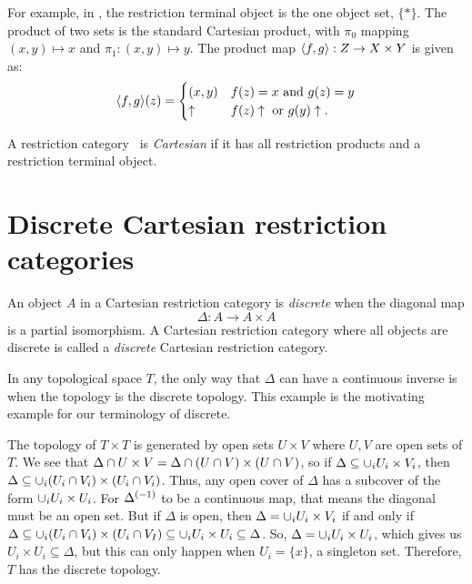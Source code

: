For example, in \Par, the restriction terminal object is the one object set, $\{*\}$. The product of
two sets is the standard Cartesian product, with $\pi_0$ mapping $(x,y) \mapsto x$ and
$\pi_1:(x,y)\mapsto y$. The product map $\langle f,g\rangle:Z\to X\times Y$ is given as:
\[
  \langle f,g\rangle(z) = \begin{cases}
    (x,y)&f(z) = x\text{ and } g(z) = y\\
    \uparrow&f(z) \uparrow\text{ or }g(y)\uparrow.
    \end{cases}
\]

\begin{definition}\label{def:cartesian_restriction_category}
  A restriction category \X\ is \emph{Cartesian} if it has all restriction products
  and a restriction terminal object.
\end{definition}

\section{Discrete Cartesian restriction categories}\label{sub:discrete_restriction_categories}

\begin{definition}\label{def:discrete_object_and_discrete_cartesian}
  An object $A$ in a Cartesian restriction category is \emph{discrete}
  when the diagonal map
  \[
    \Delta:A \to A \times A
  \]
  is a partial isomorphism.
  A  Cartesian restriction category where all objects are
  discrete is called a \emph{discrete} Cartesian restriction category.
\end{definition}


\begin{example}\label{ex:topcatp-not-discrete}
  In any topological space $T$, the only way that $\Delta$ can have a continuous inverse is when the
  topology is the discrete topology. This example is the motivating example for our terminology of
  discrete.

  The topology of $T\times T$ is generated by open sets $U\times V$ where $U,V$ are open sets of
  $T$. We see that $\Delta \cap U\times V = \Delta \cap (U\cap V) \times
  (U\cap V)$, so if $\Delta \subseteq \cup_i U_i\times V_i$, then  $\Delta \subseteq
  \cup_i (U_i\cap V_i)\times( U_i\cap V_i)$. Thus, any open cover of $\Delta$ has a
  subcover of the form $\cup_i U_i\times U_i$. For ${\Delta}^{(-1)}$ to be a continuous
  map, that means the diagonal must be an open set. But if $\Delta$ is open, then $\Delta = \cup_i
  U_i\times V_i$ if and only if $\Delta \subseteq \cup_i (U_i\cap V_i) \times (U_i \cap
  V_I) \subseteq \cup_i U_i \times U_i \subseteq \Delta$. So, $\Delta = \cup_i U_i \times U_i$,
  which gives us $U_i \times U_i \subseteq \Delta$, but this can only happen when $U_i = \{x\}$, a
  singleton set.  Therefore, $T$ has the discrete topology.
\end{example}

